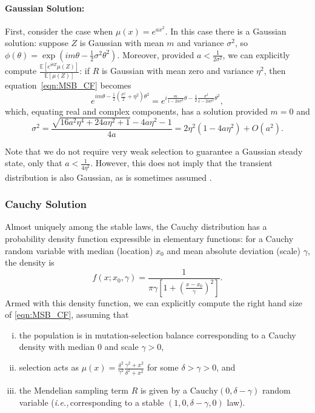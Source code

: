 \documentclass{article}
\newcommand{\ie}{\textit{i.e.,}\,}
\newcommand{\1}{\mathbbm{1}}
\theoremstyle{remark}
\theoremstyle{definition}
\begin{document}
\paragraph{Gaussian Solution:}
First, consider the case when $\mu(x) = e^{a x^{2}}$.   In this case there is a Gaussian solution: suppose $Z$ is Gaussian with mean $m$ and variance $\sigma^{2}$, so
$ \phi(\theta) = \exp(i m \theta - \frac{1}{2} \sigma^{2} \theta^{2}).  $
Moreover, provided $a < \frac{1}{2\sigma^{2}}$, we can explicitly compute $\frac{\mathbb{E}\left[e^{i \theta Z}\mu(Z)\right]}{\mathbb{E}[\mu(Z)]}$: %
if $R$ is Gaussian with mean zero and variance $\eta^2$, then equation~\eqref{eqn:MSB_CF} becomes
\[
	e^{i m \theta - \frac{1}{2} \left(\frac{\sigma^{2}}{2} + \eta^{2}\right)\theta^{2}}
	= e^{i \frac{m}{1-2 a \sigma^{2}}\theta 
		- \frac{1}{2} \frac{\sigma^{2}}{1-2 a \sigma^{2}}\theta^{2}},
\]
which, equating real and complex components, has a solution provided $m = 0$ and
\[
	\sigma^{2} = \frac{\sqrt{16 a^{2} \eta^{4} + 24 a \eta^{2}+1} - 4a \eta^{2} -1}{4a} 
	=  2\eta^{2}(1-4a\eta^{2}) + O(a^{2}).
\]

Note that we do not require very weak selection to guarantee a Gaussian steady state, only that $a < \frac{1}{4\eta^{2}}$.  However, this does not imply that the transient distribution is also Gaussian, as is sometimes assumed \citep[e.g.,][]{lande1976natural}. %


\subsubsection{Cauchy Solution}
    \label{sec:stabilizing_cauchy}

Almost uniquely among the stable laws, the Cauchy distribution has a probability density function expressible in elementary functions: 
for a Cauchy random variable with median (location) $x_{0}$ and mean absolute deviation (scale) $\gamma$, the density is 
\begin{equation}\label{eq:Cpdf}
	f(x;x_{0},\gamma) = \frac{1}{\pi\gamma\left[1+\left(\frac{x-x_{0}}{\gamma}\right)^{2}\right]}.  
\end{equation}	
Armed with this density function, we can explicitly compute the right hand size of \eqref{eqn:MSB_CF}, assuming that 
\begin{enumerate}[(i)]
\item the population is in mutation-selection balance corresponding to a Cauchy density with median 0 and scale $\gamma > 0$,
\item selection acts as $\mu(x) = \frac{\delta^{2}}{\gamma^{2}} \frac{\gamma^{2} + x^{2}}{\delta^{2} + x^{2}}$ for some $\delta > \gamma > 0$, and
\item the Mendelian sampling term $R$ is given by a $\text{Cauchy}(0,\delta-\gamma)$ random variable (\ie corresponding to a stable $(1,0,\delta-\gamma,0)$ law).
\end{enumerate}
\end{document}
